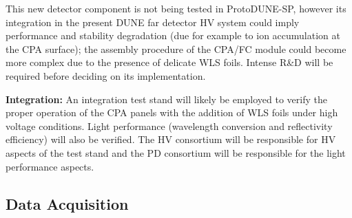 This new detector component is not being tested in ProtoDUNE-SP, however its integration in the present DUNE far detector HV system could imply performance and stability degradation (due for example to ion accumulation at the CPA surface); the assembly procedure of the CPA/FC module could become more complex due to the presence of delicate WLS foils. Intense R\&D will be required before deciding on its implementation.

\textbf{Integration:} An integration test stand will likely be employed to verify the proper operation of the CPA panels with the addition of WLS foils under high voltage conditions. Light performance (wavelength conversion and reflectivity efficiency) will also be verified. The HV consortium will be responsible for HV aspects of the test stand and the PD consortium will be responsible for the light performance aspects.


\subsection{Data Acquisition}
\label{sec:fdsp-pd-intfc-daq}







